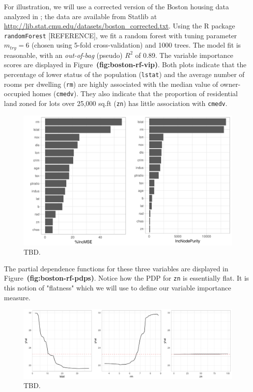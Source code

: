 \documentclass{article}
\def\code#1{\texttt{#1}}
\def\ref#1{\textbf{(#1)}}
\begin{document}
For illustration, we will use a corrected version of the Boston housing data analyzed in \citet{harrison-1978-hedonic}; the data are available from Statlib at \url{http://lib.stat.cmu.edu/datasets/boston_corrected.txt}. Using the R package \texttt{randomForest} [REFERENCE], we fit a random forest with tuning parameter $m_{try} = 6$ (chosen using 5-fold cross-validation) and 1000 trees. The model fit is reasonable, with an \textit{out-of-bag} (pseudo) $R^2$ of 0.89. The variable importance scores are displayed in Figure~\ref{fig:boston-rf-vip}. Both plots indicate that the percentage of lower status of the population (\code{lstat}) and the average number of rooms per dwelling (\code{rm}) are highly associated with the median value of owner-occupied homes (\code{cmedv}). They also indicate that the proportion of residential land zoned for lots over 25,000 sq.ft (\code{zn}) has little association with \code{cmedv}.
\begin{figure}[!htb]
  \label{boston-rf-vip}
  \centering
  \includegraphics[width=1.0\textwidth]{boston-rf-vip}
  \caption{TBD.}
\end{figure}

The partial dependence functions for these three variables are displayed in Figure~\ref{fig:boston-rf-pdps}. Notice how the PDP for \code{zn} is essentially flat. It is this notion of "flatness" which we will use to define our variable importance measure.
\begin{figure}[!htb]
  \label{boston-rf-pdps}
  \centering
  \includegraphics[width=1.0\textwidth]{boston-rf-pdps}
  \caption{TBD.}
\end{figure}
\end{document}
